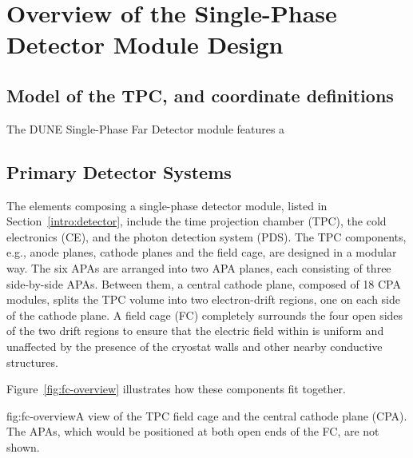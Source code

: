 \chapter{Overview of the Single-Phase Detector Module Design}
\label{ch:fdsp-ov}

\section{Model of the TPC, and coordinate definitions}
\label{sec:fdsp-ov-model}

The DUNE Single-Phase Far Detector module features a 


\section{Primary Detector Systems}
\label{sec:fdsp-ov-sys}


The elements composing a single-phase detector module, listed in Section~\ref{intro:detector}, include the time projection chamber (TPC), the cold electronics (CE), and the photon detection system (PDS).  The TPC components, e.g., anode planes, cathode planes and the field cage, are designed in a modular way.  
The six APAs are arranged into two APA planes, each consisting of three side-by-side APAs. Between them,  
a central cathode plane, composed of 18 CPA modules, splits the TPC volume into two electron-drift regions, one on each side of the cathode plane. 
A field cage (FC) completely surrounds the four
open sides of the two drift regions to ensure that the electric field within is uniform and unaffected by the presence of the cryostat walls and other nearby conductive structures. 

Figure~\ref{fig:fc-overview} illustrates how these components fit together.


\begin{dunefigure}{fig:fc-overview}{A view of the TPC field cage and the central cathode plane (CPA). The APAs, which would be positioned at both open ends of the FC, are not shown.}
\end{dunefigure}

